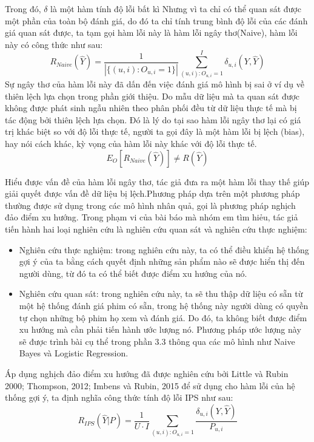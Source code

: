 Trong đó, $\delta$ là một hàm tính độ lỗi bất kì
Nhưng vì ta chỉ có thể quan sát được một phần của toàn bộ đánh giá, do đó ta chỉ tính trung bình độ lỗi của các đánh giá quan sát được, ta tạm gọi hàm lỗi này là hàm lỗi ngây thơ(Naive), hàm lỗi này có công thức như sau:
\begin{equation}
\label{eq:naive}
R_{Naive}(\hat{Y}) = \frac{1}{|\{(u,i):O_{u,i} = 1\}|} \sum_{(u,i):O_{u,i}=1}^{I} \delta_{u,i}(Y,\hat{Y}) 
\end{equation}
Sự ngây thơ của hàm lỗi này đã dấn đến việc đánh giá mô hình bị sai ở ví dụ về thiên lệch lựa chọn trong phần giới thiệu. Do mẫu dữ liệu mà ta quan sát được không được phát sinh ngẫu nhiên theo phân phối đều từ dữ liệu thực tế mà bị tác động bởi thiên lệch lựa chọn. Đó là lý do tại sao hàm lỗi ngây thơ lại có giá trị khác biệt so với độ lỗi thực tế, người ta gọi đây là một hàm lỗi bị lệch (bias), hay nói cách khác, kỳ vọng của hàm lỗi này khác với độ lỗi thực tế.
\[E_O [R_{Naive} (\hat{Y})] \ne R(\hat{Y})\]

Hiểu được vấn đề của hàm lỗi ngây thơ, tác giả đưa ra một hàm lỗi thay thế giúp giải quyết được vấn đề dữ liệu bị lệch.Phương pháp dựa trên một phương pháp thường được sử dụng trong các mô hình nhân quả, gọi là phương pháp nghịch đảo điểm xu hướng. Trong phạm vi của bài báo mà nhóm em tìm hiẻu, tác giả tiến hành hai loại nghiên cứu là nghiên cứu quan sát và nghiên cứu thực nghiệm:
\begin{itemize}
    \item Nghiên cứu thực nghiệm: trong nghiên cứu này, ta có thể điều khiển hệ thống gợi ý của ta bằng cách quyết định những sản phẩm nào sẽ được hiển thị đến người dùng, từ đó ta có thể biết được điểm xu hướng của nó.
    \item Nghiên cứu quan sát: trong nghiên cứu này, ta sẽ thu thập dữ liệu có sẵn từ một hệ thống đánh giá phim có sẵn, trong hệ thống này người dùng có quyền tự chọn những bộ phim họ xem và đánh giá. Do đó, ta không biết được điểm xu hướng mà cần phải tiến hành ước lượng nó. Phương pháp ước lượng này sẽ được trình bài cụ thể trong phần 3.3 thông qua các mô hình như Naive Bayes và Logistic Regression.
\end{itemize}

Áp dụng nghịch đảo điểm xu hướng đã được nghiên cứu bởi Little và Rubin 2000; Thompson, 2012; Imbens và Rubin, 2015 để sử dụng cho hàm lỗi của hệ thống gợi ý, ta định nghĩa công thức tính độ lỗi IPS như sau:
\begin{equation}
\label{eq:IPS}
R_{IPS}(\hat{Y}|P) = \frac{1}{U\cdot I}\sum_{(u,i):O_{u,i}=1} \frac{\delta_{u,i}(Y,\hat{Y})}{P_{u,i}}
\end{equation}

